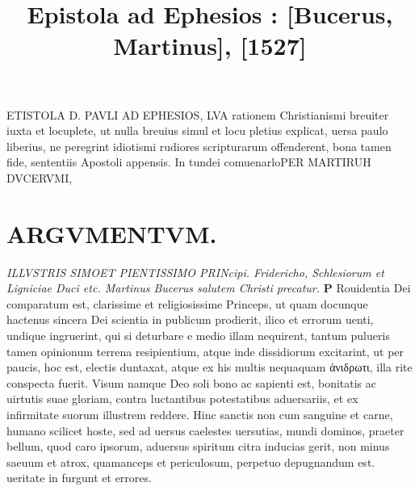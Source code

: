 \documentclass{article}
\begin{document}
\date{}
        \title{ Epistola ad Ephesios : [Bucerus, Martinus], [1527]}
\maketitle

\begin{pages} 
\beginnumbering
        ETISTOLA D. PAVLI AD EPHESIOS, LVA rationem Christianismi breuiter iuxta et locuplete, ut nulla breuius simul et locu pletius explicat, uersa paulo liberius, ne peregrint idiotismi rudiores scripturarum offenderent, bona tamen fide, sententiis Apostoli appensis. In tundei comuenarloPER MARTIRUH DVCERVMI, 
\section*{ARGVMENTVM.  }
\textit{ILLVSTRIS SIMOET PIENTISSIMO PRINcipi.  Fridericho, Schlesiorum et Ligniciae Duci etc. Martinus Bucerus salutem Christi precatur. }
\textbf{P }\pstart Rouidentia Dei comparatum est, clarissime et religiosissime Princeps, ut quam docunque hactenus sincera Dei scientia in publicum prodierit, ilico et errorum uenti, undique ingruerint, qui si deturbare e medio illam nequirent, tantum pulueris tamen opinionum terrena resipientium, atque inde dissidiorum excitarint, ut per paucis, hoc est, electis duntaxat, atque ex his multis nequaquam ἀνιδρωτι, illa rite conspecta fuerit. Visum namque Deo soli bono ac sapienti est, bonitatis ac uirtutis suae gloriam, contra luctantibus potestatibus aduersariis, et ex infirmitate suorum illustrem reddere. Hinc sanctis non cum sanguine et carne, humano scilicet hoste, sed ad uersus caelestes uersutias, mundi dominos, praeter bellum, quod caro ipsorum, aduersus spiritum citra inducias gerit, non minus saeuum et atrox, quamanceps et periculosum, perpetuo depugnandum est.   \pendProdeunte ueritate in furgunt et errores. 

\end{pages}
\end{document}
